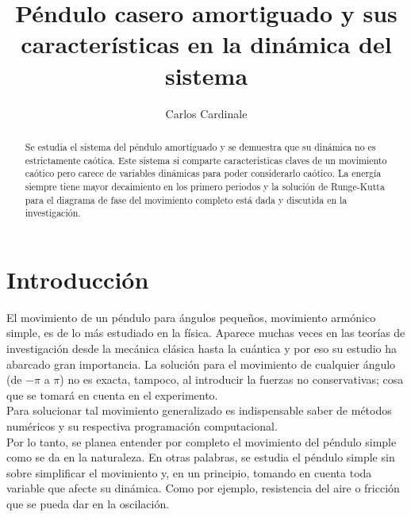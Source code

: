 \documentclass[aps,twocolumn,secnumarabic,nobalancelastpage,amsmath,amssymb,nofootinbib]{revtex4-1}
\begin{document}
	\title			{P\'endulo casero amortiguado y sus caracter\'isticas en la din\'amica del sistema}
	\author			{Carlos Cardinale}	
	
		\begin{abstract}
			Se estudia el sistema del p\'endulo amortiguado y se demuestra que su din\'amica no es estrictamente ca\'otica. Este sistema si comparte caracteristicas claves de un movimiento ca\'otico pero carece de variables din\'amicas para poder considerarlo ca\'otico. La energ\'ia siempre tiene mayor decaimiento en los primero periodos y la soluci\'on de Runge-Kutta para el diagrama de fase del movimiento completo est\'a dada y discutida en la investigaci\'on.       	
		\end{abstract}
	
	\maketitle
	     	    
	\section{Introducci\'on}
		El movimiento de un p\'endulo para \'angulos pequeños, movimiento arm\'onico simple, es de lo m\'as estudiado en la f\'isica. Aparece muchas veces en las teor\'ias de investigaci\'on desde la mec\'anica cl\'asica hasta la cu\'antica y por eso su estudio ha abarcado gran importancia. La soluci\'on para el movimiento de cualquier \'angulo (de $-\pi$ a $\pi$) no es exacta, tampoco, al introducir la fuerzas no conservativas; cosa que se tomar\'a en cuenta en el experimento. \\ 
		\indent Para solucionar tal movimiento generalizado es indispensable saber de m\'etodos num\'ericos y su respectiva programaci\'on computacional.  \\		
		\indent Por lo tanto, se planea entender por completo el movimiento del p\'endulo simple 
		como se da en la naturaleza. En otras palabras, 
		se estudia el p\'endulo simple sin sobre simplificar el movimiento y, en un principio, tomando en cuenta toda variable que afecte su din\'amica. Como por ejemplo, resistencia del aire o fricci\'on que se pueda dar en la oscilaci\'on. \\
		
\end{document}
